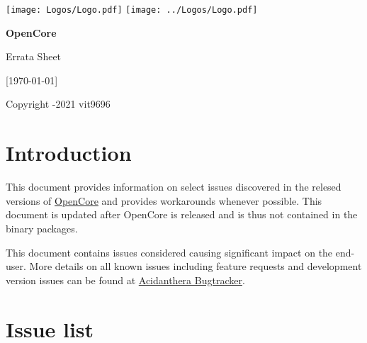 \documentclass[]{article}
\begin{document}
\begin{titlepage}
   \begin{center}
       \vspace*{2.0in}

       \Huge

         {\texttt{[image: Logos/Logo.pdf]}}
         {\texttt{[image: ../Logos/Logo.pdf]}}

       \sffamily

       \textbf{OpenCore}

       \vspace{0.2in}

       Errata Sheet

       \vspace{0.2in}

        {[}\today{]}

       \normalsize

       \vfill

       \rmfamily

       Copyright -2021 vit9696

   \end{center}
\end{titlepage}

\section{Introduction}\label{introduction}

This document provides information on select issues discovered in the relesed
versions of \href{https://github.com/acidanthera/OpenCorePkg}{OpenCore}
and provides workarounds whenever possible. This document is updated
after OpenCore is released and is thus not contained in the binary packages.

This document contains issues considered causing significant impact on the end-user.
More details on all known issues including feature requests and development version issues
can be found at \href{https://github.com/acidanthera/bugtracker}{Acidanthera Bugtracker}.

\section{Issue list}\label{issuelist}
\end{document}
